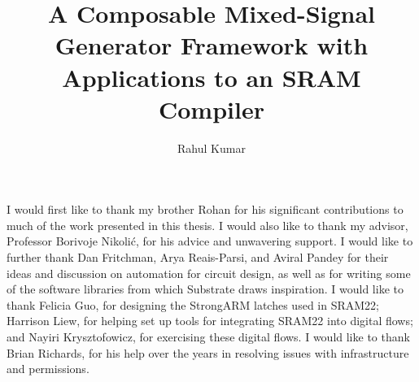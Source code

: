 \documentclass[masters]{ucbthesis}
\begin{document}

\title{A Composable Mixed-Signal Generator Framework with Applications to an SRAM Compiler}
\author{Rahul Kumar}


\maketitle
\approvalpage
\copyrightpage



\begin{frontmatter}


\tableofcontents
\clearpage
\listoffigures
\clearpage
\listoftables

\begin{acknowledgements}

I would first like to thank my brother Rohan for his significant contributions
to much of the work presented in this thesis. I would also like to thank
my advisor, Professor Borivoje Nikoli\'{c}, for his advice and unwavering support.
I would like to further thank Dan Fritchman, Arya Reais-Parsi, and Aviral Pandey
for their ideas and discussion on automation for circuit design, as well as for
writing some of the software libraries from which Substrate draws inspiration.
I would like to thank Felicia Guo, for designing the StrongARM latches used in SRAM22;
Harrison Liew, for helping set up tools for integrating SRAM22 into digital flows; and
Nayiri Krysztofowicz, for exercising these digital flows.
I would like to thank Brian Richards, for his help over the years in resolving
issues with infrastructure and permissions.

\end{acknowledgements}

\end{frontmatter}
\end{document}
